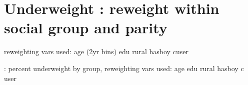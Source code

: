 \documentclass{article}
\begin{document}



\newpage 
\section{Underweight : reweight within \textbf{social group and parity} }

reweighting vars used: age (2yr bins) edu rural hasboy cuser

\begin{table}[H]
    \centering
    \footnotesize %
    \caption{: percent underweight by group, reweighting vars used: age edu rural hasboy c user}
    \label{tab:sumstat}
\end{table}













\end{document}
